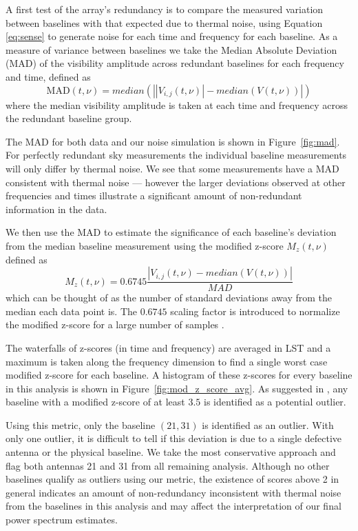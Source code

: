 A first test of the array's redundancy is to compare the measured variation between baselines
with that expected due to thermal noise, using Equation \eqref{eq:sense}
to generate noise for each time and frequency for each baseline.
As a measure of variance between baselines we take the Median Absolute Deviation
(MAD) of the visibility amplitude across redundant baselines
for each frequency and time, defined as
\begin{equation}
\text{MAD}(t,\nu) = median\left(\left| \left|V_{i,j}(t,\nu)\right|  - median \left(V(t,\nu)\right) \right|\right)\label{eqn:mad}
\end{equation}
where the median visibility amplitude is taken
at each time and frequency across the redundant baseline group.

The MAD for both data and our noise simulation is shown in  Figure~\ref{fig:mad}.
For perfectly redundant sky measurements the individual
baseline measurements will only differ by thermal noise.
We see that some measurements have a MAD consistent with thermal noise ---
however the larger deviations observed at other frequencies and times
illustrate a significant amount of non-redundant information in the data.

We then use the MAD to estimate the significance of each baseline's
deviation from the median baseline measurement using the modified z-score $ M_{z}(t,\nu) $ defined as
\begin{equation}
M_{z}(t,\nu) = 0.6745\frac{\left|V_{i,j}(t,\nu) - median \left(V(t,\nu)
	\right)\right|}{MAD} \label{eqn:zscore}
\end{equation}
which can be thought of as the number of standard deviations
away from the median each data point is.
The $ 0.6745 $ scaling factor is introduced to normalize the
modified z-score for a large number of samples \citep{Iglewicz_and_hoaglin}.

The waterfalls of z-scores (in time and frequency) are averaged in LST
and a maximum is taken along the frequency dimension to find a single
worst case modified z-score for each baseline.
A histogram of these z-scores for every baseline in this analysis is shown in Figure~\ref{fig:mod_z_score_avg}.
As suggested in \citet{Iglewicz_and_hoaglin},
any baseline with a modified z-score of at least $ 3.5 $ is identified as a potential outlier.

Using this metric, only the baseline $ (21,31)  $
is identified as an outlier. With only one outlier, it is difficult
to tell if this deviation is due
to a single defective antenna or the physical baseline.
We take the most conservative approach and flag
both antennas 21 and 31 from all remaining analysis.
Although no other baselines qualify as outliers using our metric,
the existence of scores above 2 in general
indicates an amount of non-redundancy
inconsistent with thermal noise from the baselines in this analysis and may affect
the interpretation of our final
power spectrum estimates.

